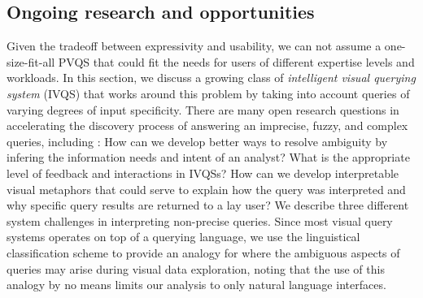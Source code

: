 \subsection{Ongoing research and opportunities}
\par Given the tradeoff between expressivity and usability, we can not assume a one-size-fit-all PVQS that could fit the needs for users of different expertise levels and workloads. In this section, we discuss a growing class of \textit{intelligent visual querying system} (IVQS) that works around this problem by taking into account queries of varying degrees of input specificity. There are many open research questions in accelerating the discovery process of answering an imprecise, fuzzy, and complex queries, including : How can we develop better ways to resolve ambiguity by infering the information needs and intent of an analyst? What is the appropriate level of feedback and interactions in IVQSs? How can we develop interpretable visual metaphors that could serve to explain how the query was interpreted and why specific query results are returned to a lay user?
 We describe three different system challenges in interpreting non-precise queries. Since most visual query systems operates on top of a querying language, we use the linguistical classification scheme to provide an analogy for where the ambiguous aspects of queries may arise during visual data exploration, noting that the use of this analogy by no means limits our analysis to only natural language interfaces.

